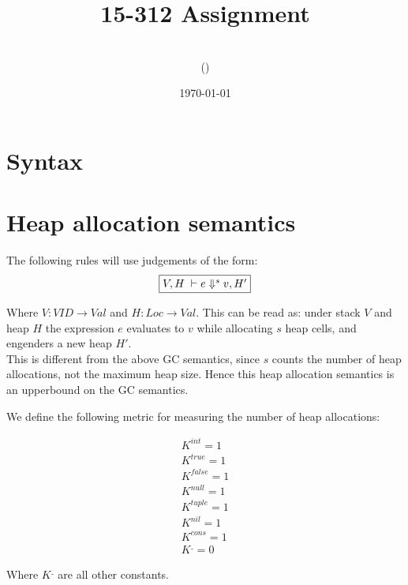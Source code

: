 \documentclass[11pt]{article}
\title{15-312 Assignment \hwnumber}
\author{\myname\\(\myandrewid)}
\date{\today}
\newcounter{rule}
\begin{document}
\maketitle

\section{Syntax}\section{Heap allocation semantics}

The following rules will use judgements of the form:
\[
\fbox{$V,H\; \vdash e \Downarrow^s v, H'$}
\]

Where $V : VID \to Val$ and $H : Loc \to Val$. This can be read as: under stack $V$ and heap $H$
the expression $e$ evaluates to $v$ while allocating $s$ heap cells, and engenders a new heap $H'$.\\

This is different from the above GC semantics, since $s$ counts the number of heap allocations, not the maximum heap size.
Hence this heap allocation semantics is an upperbound on the GC semantics.

We define the following metric for measuring the number of heap allocations:

\begin{align*}
  K^{int} = 1\\
  K^{true} = 1\\
  K^{false} = 1\\
  K^{null} = 1\\
  K^{tuple} = 1\\
  K^{nil} = 1\\
  K^{cons} = 1\\
  K^{\_} = 0
\end{align*}

Where $K^{\_}$ are all other constants.
\end{document}
